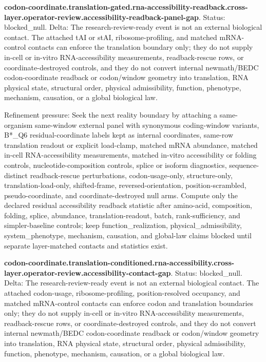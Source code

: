 \textbf{codon-coordinate.translation-gated.rna-accessibility-readback.cross-layer.operator-review.accessibility-readback-panel-gap}. Status: blocked\_null. Delta: The research-review-ready event is not an external biological contact. The attached tAI or stAI, ribosome-profiling, and matched mRNA-control contacts can enforce the translation boundary only; they do not supply in-cell or in-vitro RNA-accessibility measurements, readback-rescue rows, or coordinate-destroyed controls, and they do not convert internal newmath/BEDC codon-coordinate readback or codon/window geometry into translation, RNA physical state, structural order, physical admissibility, function, phenotype, mechanism, causation, or a global biological law.

Refinement pressure: Seek the next reality boundary by attaching a same-organism same-window external panel with synonymous coding-window variants, B*\_Q6 residual-coordinate labels kept as internal coordinates, same-row translation readout or explicit load-clamp, matched mRNA abundance, matched in-cell RNA-accessibility measurements, matched in-vitro accessibility or folding controls, nucleotide-composition controls, splice or isoform diagnostics, sequence-distinct readback-rescue perturbations, codon-usage-only, structure-only, translation-load-only, shifted-frame, reversed-orientation, position-scrambled, pseudo-coordinate, and coordinate-destroyed null arms. Compute only the declared residual accessibility readback statistic after amino-acid, composition, folding, splice, abundance, translation-readout, batch, rank-sufficiency, and simpler-baseline controls; keep function\_realization, physical\_admissibility, system\_phenotype, mechanism, causation, and global-law claims blocked until separate layer-matched contacts and statistics exist.

\textbf{codon-coordinate.translation-conditioned.rna-accessibility.cross-layer.operator-review.accessibility-contact-gap}. Status: blocked\_null. Delta: The research-review-ready event is not an external biological contact. The attached codon-usage, ribosome-profiling, position-resolved occupancy, and matched mRNA-control contacts can enforce codon and translation boundaries only; they do not supply in-cell or in-vitro RNA-accessibility measurements, readback-rescue rows, or coordinate-destroyed controls, and they do not convert internal newmath/BEDC codon-coordinate readback or codon/window geometry into translation, RNA physical state, structural order, physical admissibility, function, phenotype, mechanism, causation, or a global biological law.

